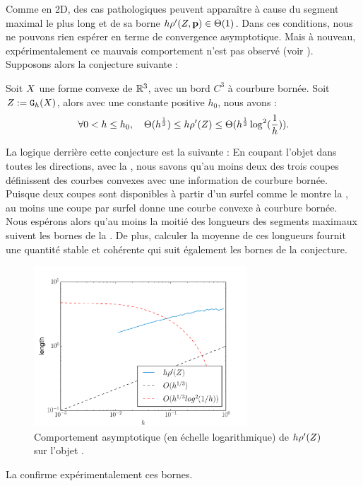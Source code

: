 %
Comme en 2D, des cas pathologiques peuvent apparaître à cause du segment maximal
le plus long et de sa borne $h\rho'(Z, \mathbf{p}) \in \Theta(1)$. Dans ces
conditions, nous ne pouvons rien espérer en terme de convergence asymptotique.
Mais à nouveau, expérimentalement ce mauvais comportement n'est pas observé
(voir ).
%
Supposons alors la conjecture suivante :
%
\begin{conjecture}
\label{conj:slice-mdss-3d}
  Soit $X$ une forme convexe de $\mathbb{R}^3$, avec un bord $C^3$ à courbure
  bornée. Soit $Z := \mathtt{G}_{h}(X)$, alors avec une constante positive $h_0$,
  nous avons :
  \begin{equation}
    \forall 0 < h \le h_0,\quad \Theta(h^{\frac{1}{3}}) \le h\rho'(Z) \le \Theta(h^{\frac{1}{3}} \log^2 (\frac{1}{h})) .
  \end{equation}
\end{conjecture}
%
La logique derrière cette conjecture est la suivante : En coupant l'objet dans
toutes les directions, avec la , nous savons
qu'au moins deux des trois coupes définissent des courbes convexes avec une
information de courbure bornée. Puisque deux coupes sont disponibles à partir
d'un surfel comme le montre la , au moins une coupe
par surfel donne une courbe convexe à courbure bornée. Nous espérons alors qu'au
moins la moitié des longueurs des segments maximaux suivent les bornes de la
. De plus, calculer la moyenne de ces
longueurs fournit une quantité stable et cohérente qui suit également les bornes
de la conjecture.
\begin{figure}[ht]{
  \begin{center}
    \includegraphics[height=6cm]{images/Curvature/Ellipsoid_Radius}
  \end{center}}
    \caption{Comportement asymptotique (en échelle logarithmique) de $h\rho'( Z )$ sur l'objet \Ellipsoid.
    \label{fig:bounds-length-MDSS-fig}}
\end{figure}
%
La  confirme expérimentalement ces bornes.


